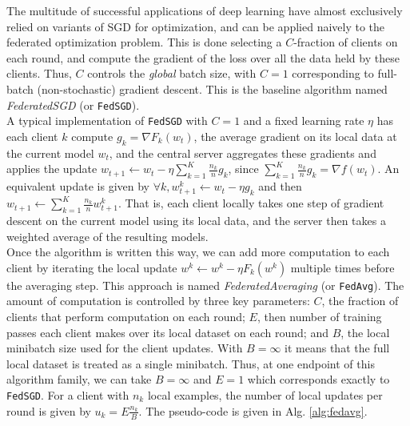 The multitude of successful applications of deep learning have almost exclusively relied on variants of SGD for optimization, and can be applied naively to the federated optimization problem. This is done selecting a $C$-fraction of clients on each round, and compute the gradient of the loss over all the data held by these clients. Thus, $C$ controls the \textit{global} batch size, with $C=1$ corresponding to full-batch (non-stochastic) gradient descent. This is the baseline algorithm named \textit{FederatedSGD} (or \texttt{FedSGD}). \\

A typical implementation of \texttt{FedSGD} with $C=1$ and a fixed learning rate $\eta$ has each client $k$ compute $g_k=\nabla F_k(w_t)$, the average gradient on its local data at the current model $w_t$, and the central server aggregates these gradients and applies the update $w_{t+1}\leftarrow w_t-\eta \sum_{k=1}^{K}\frac{n_k}{n}g_k$, since $\sum_{k=1}^{K}\frac{n_k}{n}g_k=\nabla f(w_t)$. An equivalent update is given by $\forall k, w_{t+1}^k\leftarrow w_t-\eta g_k$ and then $w_{t+1}\leftarrow \sum_{k=1}^K\frac{n_k}{n}w_{t+1}^k$. That is, each client locally takes one step of gradient descent on the current model using its local data, and the server then takes a weighted average of the resulting models. \\

Once the algorithm is written this way, we can add more computation to each client by iterating the local update $w^k\leftarrow w^k-\eta F_k(w^k)$ multiple times before the averaging step. This approach is named \textit{FederatedAveraging} (or \texttt{FedAvg}). The amount of computation is controlled by three key parameters: $C$, the fraction of clients that perform computation on each round; $E$, then number of
training passes each client makes over its local dataset on each round; and $B$, the local minibatch size used for the client updates. With $B=\infty$ it means that the full local dataset is treated as a single minibatch. Thus, at one endpoint of this algorithm family, we can take $B=\infty$ and $E=1$ which corresponds exactly to \texttt{FedSGD}. For a client with $n_k$ local examples, the number of local updates per round is given by $u_k=E\frac{n_k}{B}$. The pseudo-code is given in Alg. \ref{alg:fedavg}.


